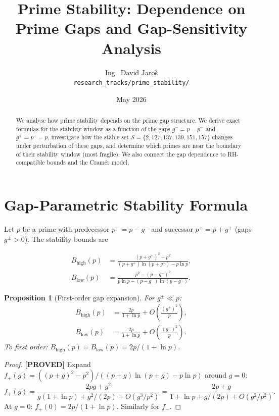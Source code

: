\documentclass[11pt,a4paper]{article}
\title{Prime Stability: Dependence on Prime Gaps and Gap-Sensitivity Analysis}
\author{Ing.\ David Jaro\v{s}\\
\small \texttt{research\_tracks/prime\_stability/}}
\date{May 2026}
\newtheorem{proposition}{Proposition}
\newcommand{\proved}[1]{\textbf{[PROVED]} #1}
\newcommand{\Sc}{\mathcal{S}}
\begin{document}
\maketitle

\begin{abstract}
We analyse how prime stability depends on the prime gap structure.  We
derive exact formulas for the stability window as a function of the gaps
$g^- = p - p^-$ and $g^+ = p^+ - p$, investigate how the stable set
$\Sc = \{2, 127, 137, 139, 151, 157\}$ changes under perturbation of these
gaps, and determine which primes are near the boundary of their stability
window (most fragile).  We also connect the gap dependence to
RH-compatible bounds and the Cram\'er model.
\end{abstract}

\tableofcontents

\section{Gap-Parametric Stability Formula}

Let $p$ be a prime with predecessor $p^- = p - g^-$ and successor
$p^+ = p + g^+$ (gaps $g^\pm > 0$).  The stability bounds are

\begin{align}
  B_\mathrm{high}(p) &= \frac{(p+g^+)^2 - p^2}{(p+g^+)\ln(p+g^+) - p\ln p}, \\
  B_\mathrm{low}(p) &= \frac{p^2 - (p-g^-)^2}{p\ln p - (p-g^-)\ln(p-g^-)}.
\end{align}

\begin{proposition}[First-order gap expansion]
  \label{prop:firstorder}
  For $g^\pm \ll p$:
  \begin{align}
    B_\mathrm{high}(p) &= \frac{2p}{1+\ln p} + O\!\left(\frac{(g^+)^2}{p}\right), \\
    B_\mathrm{low}(p) &= \frac{2p}{1+\ln p} + O\!\left(\frac{(g^-)^2}{p}\right).
  \end{align}
  To first order: $B_\mathrm{high}(p) = B_\mathrm{low}(p) = 2p/(1+\ln p)$.
\end{proposition}

\begin{proof}
  \proved{}
  Expand $f_+(g) = ((p+g)^2 - p^2)/((p+g)\ln(p+g) - p\ln p)$ around $g = 0$:
  \[
    f_+(g) = \frac{2pg + g^2}{g(1+\ln p) + g^2/(2p) + O(g^3/p^2)}
    = \frac{2p + g}{1+\ln p + g/(2p) + O(g^2/p^2)}.
  \]
  At $g = 0$: $f_+(0) = 2p/(1+\ln p)$.  Similarly for $f_-$.
\end{proof}
\end{document}
